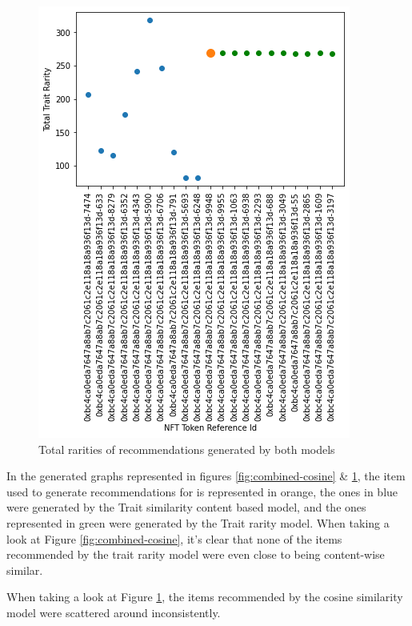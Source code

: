 \documentclass[conference]{IEEEtran}
\begin{document}
\begin{figure}[htbp]
\centerline{\includegraphics[width=\linewidth]{images/Total rarities content + rarity based.png}}
\caption{Total rarities of recommendations generated by both models}
\label{fig:combined-rarity}
\end{figure}


In the generated graphs represented in figures \ref{fig:combined-cosine} \& \ref{fig:combined-rarity}, the item used to generate recommendations for is represented in orange, the ones in blue were generated by the Trait similarity content based model, and the ones represented in green were generated by the Trait rarity model.
When taking a look at Figure \ref{fig:combined-cosine}, it's clear that none of the items recommended by the trait rarity model were even close to being content-wise similar.

When taking a look at Figure \ref{fig:combined-rarity}, the items recommended by the cosine similarity model were scattered around inconsistently.
\end{document}
